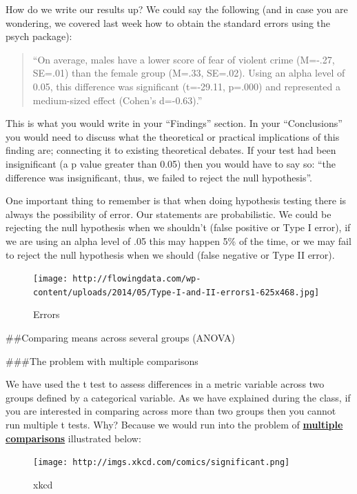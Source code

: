 \documentclass[]{book}
\theoremstyle{definition}
\theoremstyle{definition}
\theoremstyle{definition}
\theoremstyle{remark}
\begin{document}
How do we write our results up? We could say the following (and in case
you are wondering, we covered last week how to obtain the standard
errors using the psych package):

\begin{quote}
``On average, males have a lower score of fear of violent crime (M=-.27,
SE=.01) than the female group (M=.33, SE=.02). Using an alpha level of
0.05, this difference was significant (t=-29.11, p=.000) and represented
a medium-sized effect (Cohen's d=-0.63).''
\end{quote}

This is what you would write in your ``Findings'' section. In your
``Conclusions'' you would need to discuss what the theoretical or
practical implications of this finding are; connecting it to existing
theoretical debates. If your test had been insignificant (a p value
greater than 0.05) then you would have to say so: ``the difference was
insignificant, thus, we failed to reject the null hypothesis''.

One important thing to remember is that when doing hypothesis testing
there is always the possibility of error. Our statements are
probabilistic. We could be rejecting the null hypothesis when we
shouldn't (false positive or Type I error), if we are using an alpha
level of .05 this may happen 5\% of the time, or we may fail to reject
the null hypothesis when we should (false negative or Type II error).

\begin{figure}
\centering
\texttt{[image: http://flowingdata.com/wp-content/uploads/2014/05/Type-I-and-II-errors1-625x468.jpg]}
\caption{Errors}
\end{figure}

\#\#Comparing means across several groups (ANOVA)

\#\#\#The problem with multiple comparisons

We have used the t test to assess differences in a metric variable
across two groups defined by a categorical variable. As we have
explained during the class, if you are interested in comparing across
more than two groups then you cannot run multiple t tests. Why? Because
we would run into the problem of
\href{http://en.wikipedia.org/wiki/Multiple_comparisons_problem}{\textbf{multiple
comparisons}} illustrated below:

\begin{figure}
\centering
\texttt{[image: http://imgs.xkcd.com/comics/significant.png]}
\caption{xkcd}
\end{figure}
\end{document}
